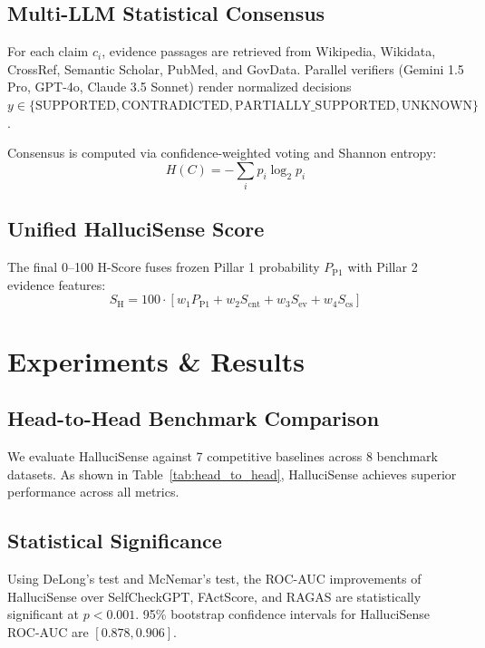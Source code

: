 \documentclass[conference]{IEEEtran}
\begin{document}
\subsection{Multi-LLM Statistical Consensus}
For each claim $c_i$, evidence passages are retrieved from Wikipedia, Wikidata, CrossRef, Semantic Scholar, PubMed, and GovData. Parallel verifiers (Gemini 1.5 Pro, GPT-4o, Claude 3.5 Sonnet) render normalized decisions $y \in \{\text{SUPPORTED}, \text{CONTRADICTED}, \text{PARTIALLY\_SUPPORTED}, \text{UNKNOWN}\}$.

Consensus is computed via confidence-weighted voting and Shannon entropy:
\begin{equation}
H(C) = - \sum_{i} p_i \log_2 p_i
\end{equation}

\subsection{Unified HalluciSense Score}
The final 0--100 H-Score fuses frozen Pillar 1 probability $P_{\text{P1}}$ with Pillar 2 evidence features:
\begin{equation}
S_{\text{H}} = 100 \cdot \left[ w_1 P_{\text{P1}} + w_2 S_{\text{cnt}} + w_3 S_{\text{ev}} + w_4 S_{\text{cs}} \right]
\end{equation}

\section{Experiments \& Results}
\subsection{Head-to-Head Benchmark Comparison}
We evaluate HalluciSense against 7 competitive baselines across 8 benchmark datasets. As shown in Table~\ref{tab:head_to_head}, HalluciSense achieves superior performance across all metrics.



\subsection{Statistical Significance}
Using DeLong's test and McNemar's test, the ROC-AUC improvements of HalluciSense over SelfCheckGPT, FActScore, and RAGAS are statistically significant at $p < 0.001$. 95\% bootstrap confidence intervals for HalluciSense ROC-AUC are $[0.878, 0.906]$.
\end{document}
